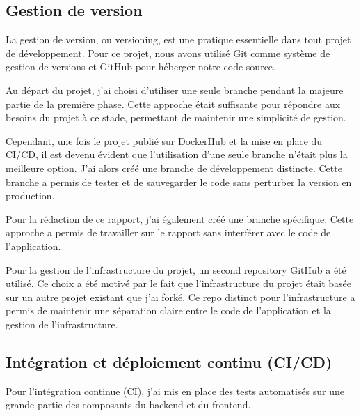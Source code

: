 \subsection{Gestion de version}\label{subsec:gestion-de-version}

La gestion de version, ou versioning, est une pratique essentielle dans tout projet de développement.
Pour ce projet, nous avons utilisé Git comme système de gestion de versions et GitHub pour héberger notre code source.

Au départ du projet, j'ai choisi d'utiliser une seule branche pendant la majeure partie de la première phase.
Cette approche était suffisante pour répondre aux besoins du projet à ce stade, permettant de maintenir une simplicité de gestion.

Cependant, une fois le projet publié sur DockerHub et la mise en place du CI/CD, il est devenu évident que l'utilisation d'une seule branche n'était plus la meilleure option.
J'ai alors créé une branche de développement distincte.
Cette branche a permis de tester et de sauvegarder le code sans perturber la version en production.

Pour la rédaction de ce rapport, j'ai également créé une branche spécifique.
Cette approche a permis de travailler sur le rapport sans interférer avec le code de l'application.

Pour la gestion de l'infrastructure du projet, un second repository GitHub a été utilisé.
Ce choix a été motivé par le fait que l'infrastructure du projet était basée sur un autre projet existant que j'ai forké.
Ce repo distinct pour l'infrastructure a permis de maintenir une séparation claire entre le code de l'application et la gestion de l'infrastructure.

\subsection{Intégration et déploiement continu (CI/CD)}\label{subsec:integration-et-deploiement-continu-(ci/cd)}

Pour l'intégration continue (CI), j'ai mis en place des tests automatisés sur une grande partie des composants du backend et du frontend.

